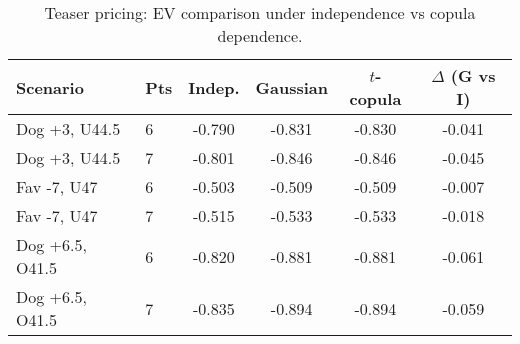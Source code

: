 \begin{table}[t]
  \centering
  \small
  \caption{Teaser pricing: EV comparison under independence vs copula dependence.}
  \begin{tabular}{llcccc}
    \toprule
    Scenario & Pts & Indep. & Gaussian & $t$-copula & $\Delta$ (G vs I) \\
    \midrule
    Dog +3, U44.5 & 6 & -0.790 & -0.831 & -0.830 & -0.041 \\
    Dog +3, U44.5 & 7 & -0.801 & -0.846 & -0.846 & -0.045 \\
    Fav -7, U47 & 6 & -0.503 & -0.509 & -0.509 & -0.007 \\
    Fav -7, U47 & 7 & -0.515 & -0.533 & -0.533 & -0.018 \\
    Dog +6.5, O41.5 & 6 & -0.820 & -0.881 & -0.881 & -0.061 \\
    Dog +6.5, O41.5 & 7 & -0.835 & -0.894 & -0.894 & -0.059 \\
    \bottomrule
  \end{tabular}
  \label{tab:teaser_ev_copula}
\end{table}